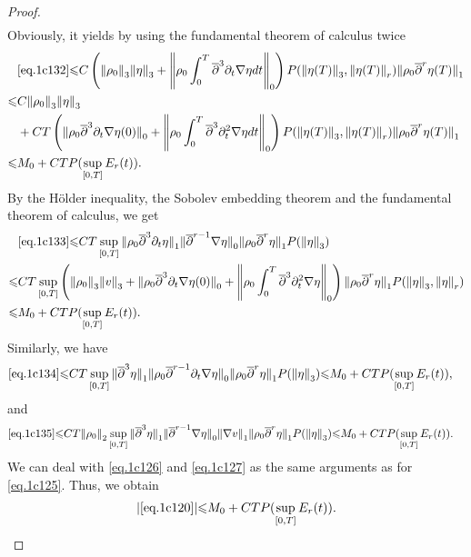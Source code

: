 \documentclass[12pt,twoside,reqno]{amsart}
\numberwithin{equation}{section}
\theoremstyle{definition}
\theoremstyle{remark}
\begin{document}
\begin{proof}
\begin{align}
\end{align}
Obviously, it yields by using the fundamental theorem of calculus twice
\begin{align*}
  &\eqref{eq.1c132}{\leqslant} C\left({\Vert{\rho_0}\Vert}_3{\Vert{\eta}\Vert}_3+{\left\Vert{{\rho_0} \int_0^T{\overline{\partial}}^3{\partial}_t{\nabla}\eta dt}\right\Vert}_0\right)P({\Vert{\eta(T)}\Vert}_3,{\Vert{\eta(T)}\Vert}_r){\Vert{{\rho_0} {\overline{\partial}}^r\eta(T)}\Vert}_1\\
  {\leqslant} &C{\Vert{\rho_0}\Vert}_3{\Vert{\eta}\Vert}_3\\
  &+CT\left( {\Vert{{\rho_0} {\overline{\partial}}^3{\partial}_t{\nabla}\eta(0)}\Vert}_0+ {\left\Vert{{\rho_0} \int_0^T{\overline{\partial}}^3{\partial}_t^2{\nabla}\eta dt}\right\Vert}_0\right) P({\Vert{\eta(T)}\Vert}_3,{\Vert{\eta(T)}\Vert}_r){\Vert{{\rho_0} {\overline{\partial}}^r\eta(T)}\Vert}_1\\
  {\leqslant} &M_0+CTP(\sup_{[0,T]}E_r(t)).
\end{align*}
By the H\"older inequality, the Sobolev embedding theorem and the fundamental theorem of calculus, we get
\begin{align*}
  &\eqref{eq.1c133}{\leqslant} CT\sup_{[0,T]}{\Vert{{\rho_0} {\overline{\partial}}^3{\partial}_t\eta}\Vert}_1{\Vert{{\overline{\partial}}^{r-1}{\nabla}\eta}\Vert}_0 {\Vert{{\rho_0} {\overline{\partial}}^r\eta}\Vert}_1 P({\Vert{\eta}\Vert}_3)\\
  {\leqslant}&CT\sup_{[0,T]}\left({\Vert{\rho_0}\Vert}_3{\Vert{v}\Vert}_3 +{\Vert{{\rho_0} {\overline{\partial}}^3{\partial}_t{\nabla}\eta(0)}\Vert}_0+{\left\Vert{{\rho_0} \int_0^T {\overline{\partial}}^3{\partial}_t^2{\nabla}\eta}\right\Vert}_0\right) {\Vert{{\rho_0} {\overline{\partial}}^r\eta}\Vert}_1 P({\Vert{\eta}\Vert}_3,{\Vert{\eta}\Vert}_r)\\
  {\leqslant} &M_0+CTP(\sup_{[0,T]}E_r(t)).
\end{align*}
Similarly, we have
\begin{align*}
  \eqref{eq.1c134}{\leqslant}& CT\sup_{[0,T]}{\Vert{{\overline{\partial}}^3 \eta}\Vert}_1{\Vert{{\rho_0} {\overline{\partial}}^{r-1}{\partial}_t{\nabla}\eta}\Vert}_0 {\Vert{{\rho_0} {\overline{\partial}}^r\eta}\Vert}_1 P({\Vert{\eta}\Vert}_3)
  {\leqslant} M_0+CTP(\sup_{[0,T]}E_r(t)),
\end{align*}
and
\begin{align*}
  \eqref{eq.1c135}{\leqslant}& CT{\Vert{\rho_0}\Vert}_2\sup_{[0,T]}{\Vert{{\overline{\partial}}^3 \eta}\Vert}_1{\Vert{{\overline{\partial}}^{r-1}{\nabla}\eta}\Vert}_0 {\Vert{{\nabla} v}\Vert}_1 {\Vert{{\rho_0} {\overline{\partial}}^r\eta}\Vert}_1 P({\Vert{\eta}\Vert}_3)
  {\leqslant} M_0+CTP(\sup_{[0,T]}E_r(t)).
\end{align*}
We can deal with \eqref{eq.1c126} and \eqref{eq.1c127} as the same arguments as for \eqref{eq.1c125}. Thus, we obtain
\begin{align}
  {\vert{\eqref{eq.1c120}}\vert}{\leqslant} M_0+CTP(\sup_{[0,T]}E_r(t)).
\end{align}


\end{proof}
\end{document}
